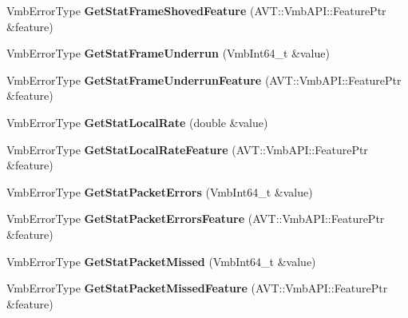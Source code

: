 \begin{DoxyCompactItemize}
\item 
\hypertarget{classMakoCamera_af563498362dfb8b0bbe4ab1546c0e2b5}{Vmb\-Error\-Type {\bfseries Get\-Stat\-Frame\-Shoved\-Feature} (A\-V\-T\-::\-Vmb\-A\-P\-I\-::\-Feature\-Ptr \&feature)}\label{classMakoCamera_af563498362dfb8b0bbe4ab1546c0e2b5}

\item 
\hypertarget{classMakoCamera_a6567d58730a9e2b1db3984f635ec8541}{Vmb\-Error\-Type {\bfseries Get\-Stat\-Frame\-Underrun} (Vmb\-Int64\-\_\-t \&value)}\label{classMakoCamera_a6567d58730a9e2b1db3984f635ec8541}

\item 
\hypertarget{classMakoCamera_a32bcb3ac7d14d3d50339006f7f5ddede}{Vmb\-Error\-Type {\bfseries Get\-Stat\-Frame\-Underrun\-Feature} (A\-V\-T\-::\-Vmb\-A\-P\-I\-::\-Feature\-Ptr \&feature)}\label{classMakoCamera_a32bcb3ac7d14d3d50339006f7f5ddede}

\item 
\hypertarget{classMakoCamera_a452c92bfd12e745cc04e24b7bb32aa11}{Vmb\-Error\-Type {\bfseries Get\-Stat\-Local\-Rate} (double \&value)}\label{classMakoCamera_a452c92bfd12e745cc04e24b7bb32aa11}

\item 
\hypertarget{classMakoCamera_a7ef66a97f6e8323312acf5e3feaab8fe}{Vmb\-Error\-Type {\bfseries Get\-Stat\-Local\-Rate\-Feature} (A\-V\-T\-::\-Vmb\-A\-P\-I\-::\-Feature\-Ptr \&feature)}\label{classMakoCamera_a7ef66a97f6e8323312acf5e3feaab8fe}

\item 
\hypertarget{classMakoCamera_a66ba4f8f149a1aa5d56db30156a08358}{Vmb\-Error\-Type {\bfseries Get\-Stat\-Packet\-Errors} (Vmb\-Int64\-\_\-t \&value)}\label{classMakoCamera_a66ba4f8f149a1aa5d56db30156a08358}

\item 
\hypertarget{classMakoCamera_a22092c94d28d5d2c47a032c19c7571e1}{Vmb\-Error\-Type {\bfseries Get\-Stat\-Packet\-Errors\-Feature} (A\-V\-T\-::\-Vmb\-A\-P\-I\-::\-Feature\-Ptr \&feature)}\label{classMakoCamera_a22092c94d28d5d2c47a032c19c7571e1}

\item 
\hypertarget{classMakoCamera_ab5c9ecf1b0e84d33d0614f7a399e30e5}{Vmb\-Error\-Type {\bfseries Get\-Stat\-Packet\-Missed} (Vmb\-Int64\-\_\-t \&value)}\label{classMakoCamera_ab5c9ecf1b0e84d33d0614f7a399e30e5}

\item 
\hypertarget{classMakoCamera_a70055d33a88c72d2038c957f87330345}{Vmb\-Error\-Type {\bfseries Get\-Stat\-Packet\-Missed\-Feature} (A\-V\-T\-::\-Vmb\-A\-P\-I\-::\-Feature\-Ptr \&feature)}\label{classMakoCamera_a70055d33a88c72d2038c957f87330345}


\end{DoxyCompactItemize}
